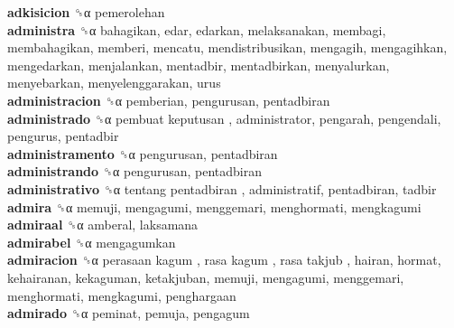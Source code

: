 \textbf{adkisicion} ␝α  pemerolehan  \\
\textbf{administra} ␝α  bahagikan, edar, edarkan, melaksanakan, membagi, membahagikan, memberi, mencatu, mendistribusikan, mengagih, mengagihkan, mengedarkan, menjalankan, mentadbir, mentadbirkan, menyalurkan, menyebarkan, menyelenggarakan, urus  \\
\textbf{administracion} ␝α  pemberian, pengurusan, pentadbiran  \\
\textbf{administrado} ␝α   pembuat keputusan , administrator, pengarah, pengendali, pengurus, pentadbir  \\
\textbf{administramento} ␝α  pengurusan, pentadbiran  \\
\textbf{administrando} ␝α  pengurusan, pentadbiran  \\
\textbf{administrativo} ␝α   tentang pentadbiran , administratif, pentadbiran, tadbir  \\
\textbf{admira} ␝α  memuji, mengagumi, menggemari, menghormati, mengkagumi  \\
\textbf{admiraal} ␝α  amberal, laksamana  \\
\textbf{admirabel} ␝α  mengagumkan  \\
\textbf{admiracion} ␝α   perasaan kagum ,  rasa kagum ,  rasa takjub , hairan, hormat, kehairanan, kekaguman, ketakjuban, memuji, mengagumi, menggemari, menghormati, mengkagumi, penghargaan  \\
\textbf{admirado} ␝α  peminat, pemuja, pengagum  \\
